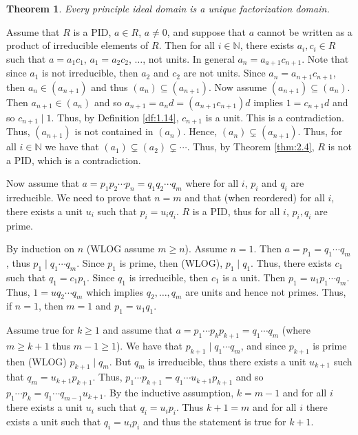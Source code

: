 \documentclass{article}
\makeatletter
\newtheorem{theorem}{Theorem}[section]
\theoremstyle{definition}
\theoremstyle{remark}
\let\oldproofname=\proofname
\renewcommand{\proofname}{\bf{\textit{\oldproofname}}}
\theoremstyle{definition}
\renewenvironment{proof}[1][\proofname]{\par
  \pushQED{\qed}%
  \normalfont \topsep6\p@\@plus6\p@\relax
  \list{}{\leftmargin=0mm
          \rightmargin=0mm
          \settowidth{\itemindent}{\itshape#1}%
          \labelwidth=4mm
          \parsep=0pt \listparindent=0mm%
  }
  \item[\hskip\labelsep
        \itshape
    #1\@addpunct{.}]\ignorespaces
}{%
  \popQED\endlist\@endpefalse
}
\makeatother
\begin{document}
    \begin{theorem}\label{thm:2.7}
        Every principle ideal domain is a unique factorization domain.
    \end{theorem}
        \begin{proof}
            Assume that $R$ is a PID, $a\in R$, $a\neq 0$, and suppose that $a$ cannot be written as a product of irreducible elements of $R$. Then for all $i\in\mathbb{N}$, there exists $a_i,c_i\in R$ such that $a=a_1c_1$, $a_1=a_2c_2$, $\dots$, not units. In general $a_n=a_{a+1}c_{n+1}$. Note that since $a_1$ is not irreducible, then $a_2$ and $c_2$ are not units. Since $a_n=a_{n+1}c_{n+1}$, then $a_n\in (a_{n+1})$ and thus $(a_n)\subseteq (a_{n+1})$. Now assume $(a_{n+1})\subseteq (a_n)$. Then $a_{n+1}\in (a_n)$ and so $a_{n+1}=a_nd=(a_{n+1}c_{n+1})d$ implies $1=c_{n+1}d$ and so $c_{n+1}\mid 1$. Thus, by Definition \ref{df:1.14}, $c_{n+1}$ is a unit. This is a contradiction. Thus, $(a_{n+1})$ is not contained in $(a_n)$. Hence, $(a_n)\subsetneq (a_{n+1})$. Thus, for all $i\in\mathbb{N}$ we have that $(a_1)\subsetneq(a_2)\subsetneq\cdots$. Thus, by Theorem \ref{thm:2.4}, $R$ is not a PID, which is a contradiction.\par\hspace{4mm} Now assume that $a=p_1p_2\cdots p_n=q_1q_2\cdots q_m$ where for all $i$, $p_i$ and $q_i$ are irreducible. We need to prove that $n=m$ and that (when reordered) for all $i$, there exists a unit $u_i$ such that $p_i=u_iq_i$. $R$ is a PID, thus for all $i$, $p_i,q_i$ are prime.\par\hspace{4mm} By induction on $n$ (WLOG assume $m\geq n$). Assume $n=1$. Then $a=p_1=q_1\cdots q_m$, thus $p_1\mid q_1\cdots q_m$. Since $p_1$ is prime, then (WLOG), $p_1\mid q_1$. Thus, there exists $c_1$ such that $q_1=c_1p_1$. Since $q_1$ is irreducible, then $c_1$ is a unit. Then $p_1=u_1p_1\cdots q_m$. Thus, $1=uq_2\cdots q_m$ which implies $q_2,\dots,q_m$ are units and hence not primes. Thus, if $n=1$, then $m=1$ and $p_1=u_1q_1$.\par\hspace{4mm} Assume true for $k\geq 1$ and assume that $a=p_1\cdots p_kp_{k+1}=q_1\cdots q_m$ (where $m\geq k+1$ thus $m-1\geq 1$). We have that $p_{k+1}\mid q_1\cdots q_m$, and since $p_{k+1}$ is prime then (WLOG) $p_{k+1}\mid q_m$. But $q_m$ is irreducible, thus there exists a unit $u_{k+1}$ such that $q_m=u_{k+1}p_{k+1}$. Thus, $p_1\cdots p_{k+1}=q_1\cdots u_{k+1}p_{k+1}$ and so $p_1\cdots p_k=q_1\cdots q_{m-1}u_{k+1}$. By the inductive assumption, $k=m-1$ and for all $i$ there exists a unit $u_i$ such that $q_i=u_ip_i$. Thus $k+1=m$ and for all $i$ there exists a unit such that $q_i=u_ip_i$ and thus the statement is true for $k+1$.
        \end{proof}
        
\end{document}
